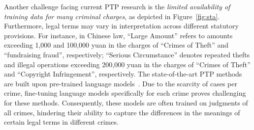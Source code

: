 Another challenge facing current PTP research is the \textit{limited availability of training data for many criminal charges}, as depicted in Figure~\ref{fig:sta}.
Furthermore, legal terms may vary in interpretation across different statutory provisions. For instance, in Chinese law, ``Large Amount'' refers to amounts exceeding 1,000 and 100,000 yuan in the charges of ``Crimes of Theft'' and ``fundraising fraud'', respectively; ``Serious Circumstance'' denotes repeated thefts and illegal operations exceeding 200,000 yuan in the charges of ``Crimes of Theft'' and ``Copyright Infringement'', respectively. 
The state-of-the-art PTP methods~\cite{neurjudge,ML-LJP} are built upon pre-trained language models~\cite{devlin-etal-2019-bert}. Due to the scarcity of cases per crime, 
fine-tuning language models specifically for each crime proves challenging for these methods. Consequently, these models are often trained on judgments of all crimes, hindering their ability to capture the differences in the meanings of certain legal terms in different crimes.




